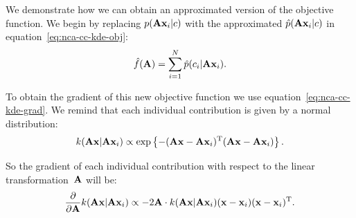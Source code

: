 We demonstrate how we can obtain an approximated version of the objective function. We begin by replacing $p(\mathbf{A}\mathbf{x}_i|c)$ with the approximated $\hat{p}(\mathbf{A}\mathbf{x}_i|c)$ in equation~\eqref{eq:nca-cc-kde-obj}:
\begin{align}
	    \hat{f}(\mathbf{A}) = \sum_{i=1}^{N} \hat{p}(c_i|\mathbf{A}\mathbf{x}_i).
	    \label{eq:nca-cc-kde-obj-approx}
\end{align}

To obtain the gradient of this new objective function we use equation~\eqref{eq:nca-cc-kde-grad}. We remind that each individual contribution is given by a normal distribution:
\begin{align}
  k(\mathbf{A}\mathbf{x}|\mathbf{A}\mathbf{x}_i) \propto \exp\left\{ -(\mathbf{A}\mathbf{x} - \mathbf{A}\mathbf{x}_i)^\textrm{T}(\mathbf{A}\mathbf{x} - \mathbf{A}\mathbf{x}_i) \right\}.
\end{align}

So the gradient of each individual contribution with respect to the linear transformation~$\mathbf{A}$ will be:
\begin{align}
  \frac{\partial}{\partial \mathbf{A}} k(\mathbf{A}\mathbf{x}|\mathbf{A}\mathbf{x}_i) \propto -2\mathbf{A}\cdot k(\mathbf{A}\mathbf{x}|\mathbf{A}\mathbf{x}_i)(\mathbf{x}-\mathbf{x}_i)(\mathbf{x}-\mathbf{x}_i)^\textrm{T}.
\end{align}

